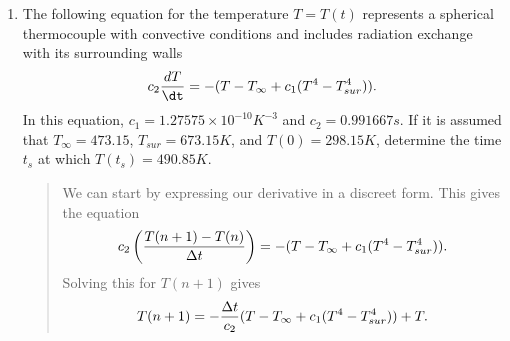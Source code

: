\documentclass{hw}
\begin{document}
\begin{enumerate}
\item The following equation for the temperature $T=T(t)$ represents a spherical thermocouple with
convective conditions and includes radiation exchange with its surrounding walls
\[
c_{2}{dT\over\dt}=-(T-T_{\infty}+c_{1}(T^{4}-T^{4}_{sur})).
\]
In this equation, $c_{1}=1.27575\times10^{-10}K^{-3}$ and $c_{2}=0.991667s$. If it is assumed that
$T_{\infty}=473.15$, $T_{sur}=673.15K$, and $T(0)=298.15K$, determine the time $t_{s}$ at which
$T(t_{s})=490.85K$.
\begin{quote}
We can start by expressing our derivative in a discreet form. This gives the equation
\[
c_{2}\left({T(n+1)-T(n)\over\Delta t}\right)=-(T-T_{\infty}+c_{1}(T^{4}-T^{4}_{sur})).
\]
Solving this for $T(n+1)$ gives
\[
T(n+1)=-{\Delta t\over c_{2}}(T-T_{\infty}+c_{1}(T^{4}-T^{4}_{sur})) + T.
\]
\end{quote}
\end{enumerate}
\end{document}
